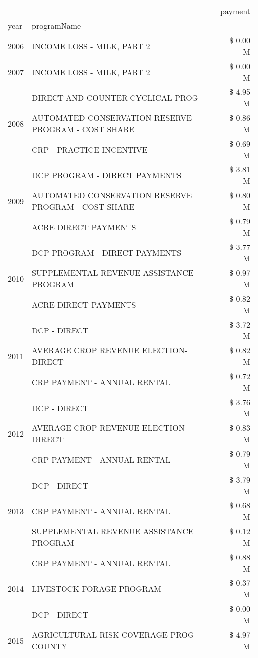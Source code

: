 \begin{tabular}{llr}
\toprule
 &  & payment \\
year & programName &  \\
\midrule
2006 & INCOME LOSS - MILK, PART 2 & \$ 0.00 M \\
\cline{1-3}
2007 & INCOME LOSS - MILK, PART 2 & \$ 0.00 M \\
\cline{1-3}
\multirow[t]{3}{*}{2008} & DIRECT AND COUNTER CYCLICAL PROG & \$ 4.95 M \\
 & AUTOMATED CONSERVATION RESERVE PROGRAM - COST SHARE & \$ 0.86 M \\
 & CRP - PRACTICE INCENTIVE & \$ 0.69 M \\
\cline{1-3}
\multirow[t]{3}{*}{2009} & DCP PROGRAM - DIRECT PAYMENTS & \$ 3.81 M \\
 & AUTOMATED CONSERVATION RESERVE PROGRAM - COST SHARE & \$ 0.80 M \\
 & ACRE DIRECT PAYMENTS & \$ 0.79 M \\
\cline{1-3}
\multirow[t]{3}{*}{2010} & DCP PROGRAM - DIRECT PAYMENTS & \$ 3.77 M \\
 & SUPPLEMENTAL REVENUE ASSISTANCE PROGRAM & \$ 0.97 M \\
 & ACRE DIRECT PAYMENTS & \$ 0.82 M \\
\cline{1-3}
\multirow[t]{3}{*}{2011} & DCP - DIRECT & \$ 3.72 M \\
 & AVERAGE CROP REVENUE ELECTION-DIRECT & \$ 0.82 M \\
 & CRP PAYMENT - ANNUAL RENTAL & \$ 0.72 M \\
\cline{1-3}
\multirow[t]{3}{*}{2012} & DCP - DIRECT & \$ 3.76 M \\
 & AVERAGE CROP REVENUE ELECTION-DIRECT & \$ 0.83 M \\
 & CRP PAYMENT - ANNUAL RENTAL & \$ 0.79 M \\
\cline{1-3}
\multirow[t]{3}{*}{2013} & DCP - DIRECT & \$ 3.79 M \\
 & CRP PAYMENT - ANNUAL RENTAL & \$ 0.68 M \\
 & SUPPLEMENTAL REVENUE ASSISTANCE PROGRAM & \$ 0.12 M \\
\cline{1-3}
\multirow[t]{3}{*}{2014} & CRP PAYMENT - ANNUAL RENTAL & \$ 0.88 M \\
 & LIVESTOCK FORAGE PROGRAM & \$ 0.37 M \\
 & DCP - DIRECT & \$ 0.00 M \\
\cline{1-3}
\multirow[t]{3}{*}{2015} & AGRICULTURAL RISK COVERAGE PROG - COUNTY & \$ 4.97 M \\

\end{tabular}
